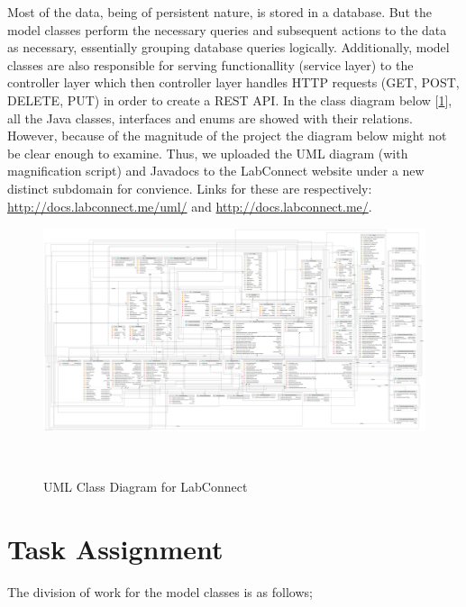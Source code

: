 \documentclass[a4paper, 12pt]{article}
\begin{document}
    Most of the data, being of persistent nature, is stored in a database. But the model classes
    perform the necessary queries and subsequent actions to the data as necessary,
    essentially grouping database queries logically. Additionally, model classes are also responsible for serving
    functionallity (service layer) to the controller layer which then controller layer handles HTTP requests (GET, POST, DELETE, PUT) in order 
    to create a REST API. In the class diagram below [\ref{fig:class-diagram}], all the Java classes, 
    interfaces and enums are showed with their relations. However, because of the magnitude of the project 
    the diagram below might not be clear enough to examine. Thus, we uploaded the UML diagram 
    (with magnification script) and Javadocs to the LabConnect website under a new distinct subdomain for convience. 
    Links for these are respectively: \href{http://docs.labconnect.me/uml/}{http://docs.labconnect.me/uml/} 
    and \href{http://docs.labconnect.me/}{http://docs.labconnect.me/}.

    \begin{figure}[H]
        \centering
        \includegraphics[width=\textwidth]{UML.jpg}
        \caption{UML Class Diagram for LabConnect}~\label{fig:class-diagram}
    \end{figure}

    
    \section{Task Assignment}
    
    The division of work for the model classes is as follows;
    
\end{document}
